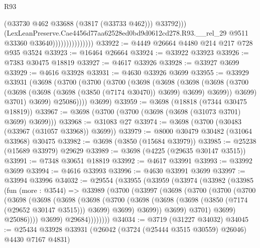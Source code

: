 \begin{lexlean}{R93}
\begin{coremodule}
                                      (@33730 @462 @33688 (@3817 (@33733 @462)))
                                      @33792)))
                                (LexLeanPreserve.Cae4456d77aa62528ed0bd9d0612cd278.R93.__rel_29
                                  @9511
                                  @33360
                                  @33640)))))))))))))))
@33922 := @4449 @26664 @4480 @214 @217 @728 @935 @3524
@33923 := @16464 @26664
@33924 := @33922 @33923
@33926 := @7383 @30475 @18819
@33927 := @4617 @33926
@33928 := @33927 @3699
@33929 := @4616 @33928
@33931 := @4630 @33926 @3699
@33955 := @33929
    @33931
    (@3698
      (@3700
        (@3700
          (@3700
            (@3698
              (@3698
                (@3698
                  (@3698
                    (@3700 (@3698 (@3698 (@3698 (@3850 (@7174 @30470)) @3699) @3699) @3699))
                    @3699)
                  @3701)
                @3699)
              @25086))))
      @3699)
@33959 := @3698 (@18818 (@7344 @30475 @18819))
@33967 := @3698 (@3700 (@3700 (@3698 (@3698 (@31073 @3701) @3699) @3699)))
@33968 := @31083 @27
@33974 := @3698 (@3700 (@30483 (@33967 (@31057 @33968)) @3699))
@33979 := @8000 @30479 @30482 (@31064 @33968) @30475
@33982 := @3698 (@3850 (@15684 @33979))
@33985 := @25238 (@15689 @33979) @29629
@33989 := @3698 (@4225 (@29635 @30147 @3515))
@33991 := @7348 @30651 @18819
@33992 := @4617 @33991
@33993 := @33992 @3699
@33994 := @4616 @33993
@33996 := @4630 @33991 @3699
@33997 := @33994 @33996
@34032 := @29554
    (@33955
      (@33959
        (@33974
          (@33982
            (@33985
              (fun (more : @3544) =>
              @33989
                (@3700
                  (@33997
                    (@3698
                      (@3700
                        (@3700
                          (@3700
                            (@3698
                              (@3698
                                (@3698
                                  (@3698
                                    (@3700
                                      (@3698
                                        (@3698
                                          (@3698 (@3850 (@7174 (@29652 @30147 @3515))) @3699)
                                          @3699)
                                        @3699))
                                    @3699)
                                  @3701)
                                @3699)
                              @25086))))
                      @3699)
                    @29684))))))))
@34034 := @3719 (@31227 @34032)
@34045 := @25434 @33928 @33931 (@26042 (@3724 (@25444 @3515 @30559) @26046) @4430 @7167 @4831)

\end{coremodule}
\end{lexlean}
